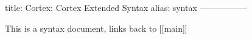 title: Cortex: Cortex Extended Syntax
alias: syntax
-----------------

This is a syntax document, links back to [[main]]